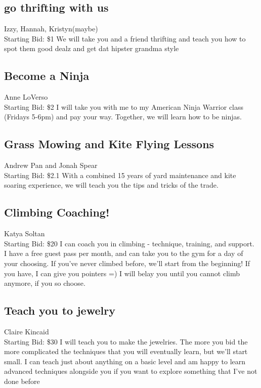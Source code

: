 \documentclass[11pt]{article}
\begin{document}
\subsection{go thrifting with us}
Izzy, Hannah, Kristyn(maybe)
\\
Starting Bid: \$1
\newline
We will take you  and a friend thrifting and teach you how to spot them good dealz and get dat hipster grandma style
\subsection{Become a Ninja}
Anne LoVerso
\\
Starting Bid: \$2
\newline
I will take you with me to my American Ninja Warrior class (Fridays 5-6pm) and pay your way.  Together, we will learn how to be ninjas.
\subsection{Grass Mowing and Kite Flying Lessons}
Andrew Pan and Jonah Spear
\\
Starting Bid: \$2.1
\newline
With a combined 15 years of yard maintenance and kite soaring experience, we will teach you the tips and tricks of the trade.
\subsection{Climbing Coaching!}
Katya Soltan
\\
Starting Bid: \$20
\newline
I can coach you in climbing - technique, training, and support. I have a free guest pass per month, and can take you to the gym for a day of your choosing. If you've never climbed before, we'll start from the beginning! If you have, I can give you pointers =) I will belay you until you cannot climb anymore, if you so choose.
\subsection{Teach you to jewelry}
Claire Kincaid
\\
Starting Bid: \$30
\newline
I will teach you to make the jewelries.  The more you bid the more complicated the techniques that you will eventually learn, but we'll start small.  I can teach just about anything on a basic level and am happy to learn advanced techniques alongside you if you want to explore something that I've not done before
\end{document}
